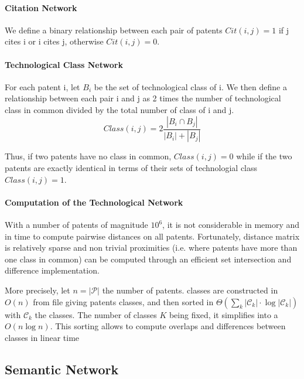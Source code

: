 \paragraph{Citation Network}

We define a binary relationship between each pair of patents $Cit(i, j) = 1$ if j cites i or i cites j, otherwise $Cit(i, j) = 0$. 

\paragraph{Technological Class Network}

For each patent i, let $B_i$ be the set of technological class of i. We then define a relationship between each pair i and j as 2 times the number of technological class in common divided by the total number of class of i and j. 
\[
Class(i,j) = 2\frac{\left\vert{B_i\cap B_j}\right\vert}{\left\vert{B_i}\right\vert+\left\vert{B_j}\right\vert}
\]

Thus, if two patents have no class in common, $Class(i,j)=0$ while if the two patents are exactly identical in terms of their sets of technologial class $Class(i,j)=1$.


\paragraph{Computation of the Technological Network}

With a number of patents of magnitude $10^6$, it is not considerable in memory and in time to compute pairwise distances on all patents. Fortunately, distance matrix is relatively sparse and non trivial proximities  (i.e. where patents have more than one class in common) can be computed through an efficient set intersection and difference implementation.

More precisely, let $n = \left|\mathcal{P}\right|$ the number of patents. classes are constructed in $O(n)$ from file giving patents classes, and then sorted in $\Theta (\sum_k{\left|\mathcal{C}_k\right|\cdot \log{\left|\mathcal{C}_k\right|}})$ with $\mathcal{C}_k$ the classes. The number of classes $K$ being fixed, it simplifies into a $O(n\log{n})$. This sorting allows to compute overlaps and differences between classes in linear time


\subsection{Semantic Network}

